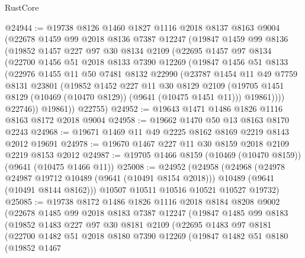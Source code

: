 \begin{lexlean}{RustCore}
\begin{coremodule}
@24944 := @19738
    @8126
    @1460
    @1827
    @1116
    @2018
    @8137
    @8163
    @9004
    (@22678
      @1459
      @99
      @2018
      @8136
      @7387
      @12247
      (@19847
        @1459
        @99
        @8136
        (@19852
          @1457
          @227
          @97
          @30
          @8134
          @2109
          (@22695
            @1457
            @97
            @8134
            (@22700
              @1456
              @51
              @2018
              @8133
              @7390
              @12269
              (@19847
                @1456
                @51
                @8133
                (@22976
                  @1455
                  @11
                  @50
                  @7481
                  @8132
                  @22990
                  (@23787
                    @1454
                    @11
                    @49
                    @7759
                    @8131
                    @23801
                    (@19852
                      @1452
                      @227
                      @11
                      @30
                      @8129
                      @2109
                      (@19705 @1451 @8129 (@10469 (@10470 @8129)) (@9641 (@10475 @1451 @11)))
                      @19861))))
              @22746))
          @19861))
      @22755)
@24952 := @19643 @1471 @1486 @1826 @1116 @8163 @8172 @2018 @9004
@24958 := @19662 @1470 @50 @13 @8163 @8170 @2243
@24968 := @19671 @1469 @11 @49 @2225 @8162 @8169 @2219 @8143 @2012 @19691
@24978 := @19670 @1467 @227 @11 @30 @8159 @2018 @2109 @2219 @8153 @2012
@24987 := @19705 @1466 @8159 (@10469 (@10470 @8159)) (@9641 (@10475 @1466 @11))
@25008 := @24952
    (@24958
      (@24968
        (@24978 @24987 @19712 @10489 (@9641 (@10491 @8154 @2018)))
        @10489
        (@9641 (@10491 @8144 @8162)))
      @10507
      @10511
      @10516
      @10521
      @10527
      @19732)
@25085 := @19738
    @8172
    @1486
    @1826
    @1116
    @2018
    @8184
    @8208
    @9002
    (@22678
      @1485
      @99
      @2018
      @8183
      @7387
      @12247
      (@19847
        @1485
        @99
        @8183
        (@19852
          @1483
          @227
          @97
          @30
          @8181
          @2109
          (@22695
            @1483
            @97
            @8181
            (@22700
              @1482
              @51
              @2018
              @8180
              @7390
              @12269
              (@19847
                @1482
                @51
                @8180
                (@19852
                  @1467

\end{coremodule}
\end{lexlean}
